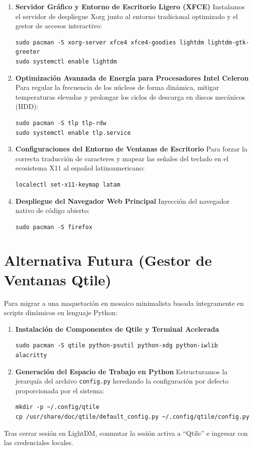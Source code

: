 \begin{enumerate}
\item [$\bullet$] \textbf{Servidor Gráfico y Entorno de Escritorio Ligero (XFCE)}
Instalamos el servidor de despliegue Xorg junto al entorno tradicional optimizado y el gestor de accesos interactivo:
\begin{footnotesize}
\begin{lstlisting}
sudo pacman -S xorg-server xfce4 xfce4-goodies lightdm lightdm-gtk-greeter
sudo systemctl enable lightdm
\end{lstlisting}
\end{footnotesize}

\item [$\bullet$] \textbf{Optimización Avanzada de Energía para Procesadores Intel Celeron}
Para regular la frecuencia de los núcleos de forma dinámica, mitigar temperaturas elevadas y prolongar los ciclos de descarga en discos mecánicos (HDD):
\begin{lstlisting}
sudo pacman -S tlp tlp-rdw
sudo systemctl enable tlp.service
\end{lstlisting}

\item [$\bullet$] \textbf{Configuraciones del Entorno de Ventanas de Escritorio}
Para forzar la correcta traducción de caracteres y mapear las señales del teclado en el ecosistema X11 al español latinoamericano:
\begin{lstlisting}
localectl set-x11-keymap latam
\end{lstlisting}

\item [$\bullet$] \textbf{Despliegue del Navegador Web Principal}
Inyección del navegador nativo de código abierto:
\begin{lstlisting}
sudo pacman -S firefox
\end{lstlisting}
\end{enumerate}

\section{Alternativa Futura (Gestor de Ventanas Qtile)}
Para migrar a una maquetación en mosaico minimalista basada íntegramente en scripts dinámicos en lenguaje Python:

\begin{enumerate}
\item [$\bullet$] \textbf{Instalación de Componentes de Qtile y Terminal Acelerada}
\begin{lstlisting}
sudo pacman -S qtile python-psutil python-xdg python-iwlib alacritty
\end{lstlisting}

\item [$\bullet$] \textbf{Generación del Espacio de Trabajo en Python}
Estructuramos la jerarquía del archivo \texttt{config.py} heredando la configuración por defecto proporcionada por el sistema:
\begin{lstlisting}
mkdir -p ~/.config/qtile
cp /usr/share/doc/qtile/default_config.py ~/.config/qtile/config.py
\end{lstlisting}
\end{enumerate}

\begin{nota}{}
Tras cerrar sesión en LightDM, conmutar la sesión activa a ``Qtile'' e ingresar con las credenciales locales.
\end{nota}